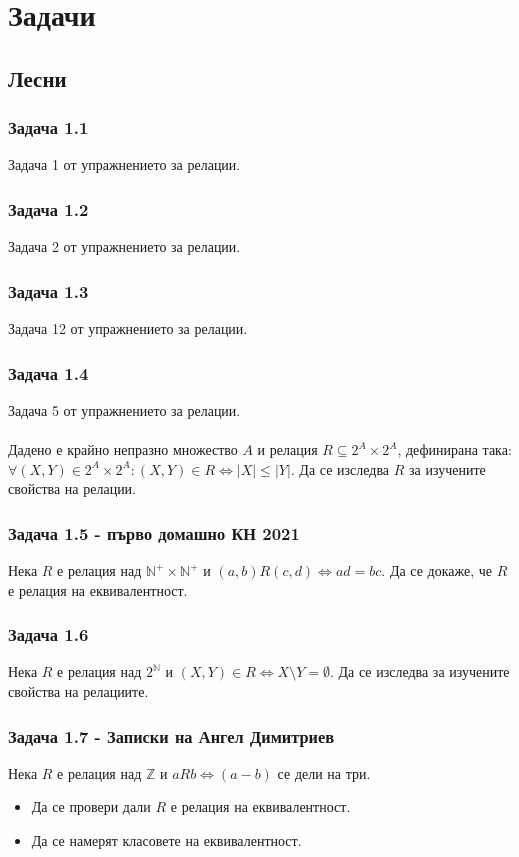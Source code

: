 \documentclass[12pt]{article}
\begin{document}
\section*{Задачи}

\subsection*{Лесни}
\subsubsection*{Задача 1.1}
Задача 1 от упражнението за релации.
\subsubsection*{Задача 1.2}
Задача 2 от упражнението за релации.
\subsubsection*{Задача 1.3}
Задача 12 от упражнението за релации.
\subsubsection*{Задача 1.4}
Задача 5 от упражнението за релации.
\paragraph*{}
Дадено е крайно непразно множество $A$ и релация $R \subseteq 2^A \times 2^A$, дефинирана така:
$\forall (X, Y) \in 2^A \times 2^A: (X, Y) \in R \iff |X| \leq |Y|$. Да се изследва $R$ за изучените свойства на релации.
\subsubsection*{Задача 1.5 - първо домашно КН 2021}
Нека $R$ е релация над $\mathbb{N}^+ \times \mathbb{N}^+$ и $(a, b)R(c, d) \iff ad=bc$. Да се докаже, че $R$ е релация на еквивалентност.
\subsubsection*{Задача 1.6}
Нека $R$ е релация над $2^\mathbb{N}$ и $(X, Y) \in R \iff X \setminus Y = \emptyset$. Да се изследва за изучените свойства на релациите.
\subsubsection*{Задача 1.7 - Записки на Ангел Димитриев}
Нека $R$ е релация над $\mathbb{Z}$ и $aRb \iff (a-b)$ се дели на три.
\begin{itemize}
    \item Да се провери дали $R$ е релация на еквивалентност.
    \item Да се намерят класовете на еквивалентност.
\end{itemize}
\end{document}
